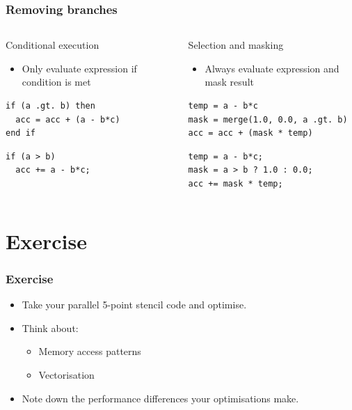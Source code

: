 \documentclass{beamer}
\begin{document}
\begin{frame}[fragile]
\frametitle{Removing branches}
\begin{columns}

\begin{column}{0.5\textwidth}
Conditional execution
\begin{itemize}
  \item Only evaluate expression if condition is met
\end{itemize}
\begin{verbatim}
if (a .gt. b) then
  acc = acc + (a - b*c)
end if
\end{verbatim}

\begin{verbatim}
if (a > b)
  acc += a - b*c;
\end{verbatim}
\end{column}

\begin{column}{0.5\textwidth}
Selection and masking
\begin{itemize}
  \item Always evaluate expression and mask result
\end{itemize}
\begin{verbatim}
temp = a - b*c
mask = merge(1.0, 0.0, a .gt. b)
acc = acc + (mask * temp)
\end{verbatim}

\begin{verbatim}
temp = a - b*c;
mask = a > b ? 1.0 : 0.0;
acc += mask * temp;
\end{verbatim}
\end{column}

\end{columns}
\end{frame}

\section{Exercise}
\begin{frame}
\frametitle{Exercise}
\begin{itemize}
  \item Take your parallel 5-point stencil code and optimise.
  \item Think about:
    \begin{itemize}
      \item Memory access patterns
      \item Vectorisation
    \end{itemize}
  \item Note down the performance differences your optimisations make.
\end{itemize}
\end{frame}

\end{document}
